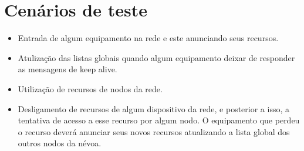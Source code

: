 \section{Cenários de teste}

\begin{itemize}
    \item Entrada de algum equipamento na rede e este anunciando seus recursos. 
    \item Atulização das listas globais quando algum equipamento deixar de responder as mensagens de keep alive.
    \item Utilização de recursos de nodos da rede.
    \item Desligamento de recursos de algum dispositivo da rede, e posterior a isso, a tentativa de acesso a esse recurso por algum nodo.
    O equipamento que perdeu o recurso deverá anunciar seus novos recursos atualizando a lista global dos outros nodos da névoa.
\end{itemize}









